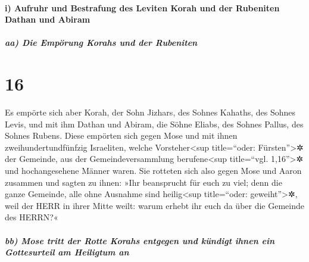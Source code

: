 \hypertarget{i-aufruhr-und-bestrafung-des-leviten-korah-und-der-rubeniten-dathan-und-abiram}{%
\paragraph{i) Aufruhr und Bestrafung des Leviten Korah und der Rubeniten
Dathan und
Abiram}\label{i-aufruhr-und-bestrafung-des-leviten-korah-und-der-rubeniten-dathan-und-abiram}}

\hypertarget{aa-die-empuxf6rung-korahs-und-der-rubeniten}{%
\subparagraph{aa) Die Empörung Korahs und der
Rubeniten}\label{aa-die-empuxf6rung-korahs-und-der-rubeniten}}

\hypertarget{section-15}{%
\section{16}\label{section-15}}

Es empörte sich aber Korah, der Sohn Jizhars, des Sohnes
Kahaths, des Sohnes Levis, und mit ihm Dathan und Abiram, die Söhne
Eliabs, des Sohnes Pallus, des Sohnes Rubens. Diese
empörten sich gegen Mose und mit ihnen zweihundertundfünfzig Israeliten,
welche Vorsteher\textless sup title=``oder: Fürsten''\textgreater✲ der
Gemeinde, aus der Gemeindeversammlung berufene\textless sup title=``vgl.
1,16''\textgreater✲ und hochangesehene Männer waren. Sie
rotteten sich also gegen Mose und Aaron zusammen und sagten zu ihnen:
»Ihr beansprucht für euch zu viel; denn die ganze Gemeinde, alle ohne
Ausnahme sind heilig\textless sup title=``oder: geweiht''\textgreater✲,
weil der HERR in ihrer Mitte weilt: warum erhebt ihr euch da über die
Gemeinde des HERRN?«

\hypertarget{bb-mose-tritt-der-rotte-korahs-entgegen-und-kuxfcndigt-ihnen-ein-gottesurteil-am-heiligtum-an}{%
\subparagraph{bb) Mose tritt der Rotte Korahs entgegen und kündigt ihnen
ein Gottesurteil am Heiligtum
an}\label{bb-mose-tritt-der-rotte-korahs-entgegen-und-kuxfcndigt-ihnen-ein-gottesurteil-am-heiligtum-an}}

